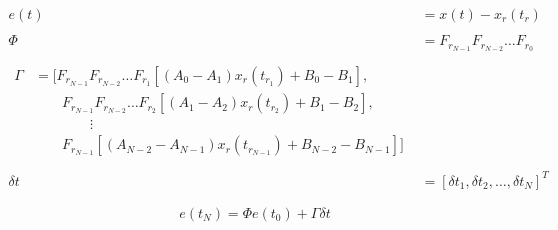 \begin{align}
	e(t) &= x(t) - x_r(t_r) \\ \nonumber \\
	\Phi &= F_{r_{N-1}} F_{r_{N-2}} \ldots F_{r_0} \\ \nonumber \\
	\begin{split}
		\Gamma &= \Big[ F_{r_{N-1}}F_{r_{N-2}} \ldots F_{r_1} [(A_0 - A_1) x_r(t_{r_1}) + B_0 - B_1], \\
		& \qquad F_{r_{N-1}}F_{r_{N-2}} \ldots F_{r_2} [(A_1 - A_2) x_r(t_{r_2}) + B_1 - B_2], \\
		& \qquad \qquad \vdots \\
		& \qquad F_{r_{N-1}}[(A_{N-2} - A_{N-1}) x_r(t_{r_{N-1}}) + B_{N-2} - B_{N-1}]\Big]
	\end{split} \\ \nonumber \\
	\delta t &= [\delta t_1, \delta t_2, \ldots, \delta t_N]^T
\end{align}

\begin{equation}
	e(t_N) = \Phi e(t_0) + \Gamma \delta t
\end{equation}